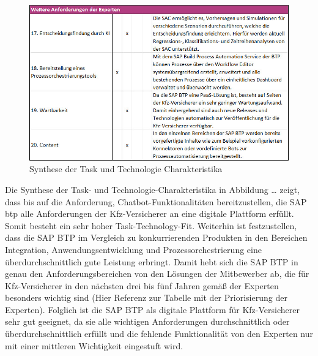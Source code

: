 \begin{figure}[ht]
    \centering
    \includegraphics[width=1\textwidth]{img/TTFTeil3E.jpg}
    \caption[Synthese der Task und Technologie Charakteristika ]{Synthese der Task und Technologie Charakteristika \autocite{TTFTeil3}}
    \label{fig:TTFTeil3}
\end{figure}



\FloatBarrier



Die Synthese der Task- und Technologie-Charakteristika in Abbildung … zeigt, dass bis auf die Anforderung, Chatbot-Funktionalitäten bereitzustellen, die SAP \ac{btp} alle Anforderungen der Kfz-Versicherer an eine digitale Plattform erfüllt. Somit besteht ein sehr hoher Task-Technology-Fit. Weiterhin ist festzustellen, dass die SAP BTP im Vergleich zu konkurrierenden Produkten in den Bereichen Integration, Anwendungsentwicklung und Prozessorchestrierung eine überdurchschnittlich gute Leistung erbringt. Damit hebt sich die SAP BTP in genau den Anforderungsbereichen von den Lösungen der Mitbewerber ab, die für Kfz-Versicherer in den nächsten drei bis fünf Jahren gemäß der Experten besonders wichtig sind (Hier Referenz zur Tabelle mit der Priorisierung der Experten). Folglich ist die SAP BTP als digitale Plattform für Kfz-Versicherer sehr gut geeignet, da sie alle wichtigen Anforderungen durchschnittlich oder überdurchschnittlich erfüllt und die fehlende Funktionalität von den Experten nur mit einer mittleren Wichtigkeit eingestuft wird. 


